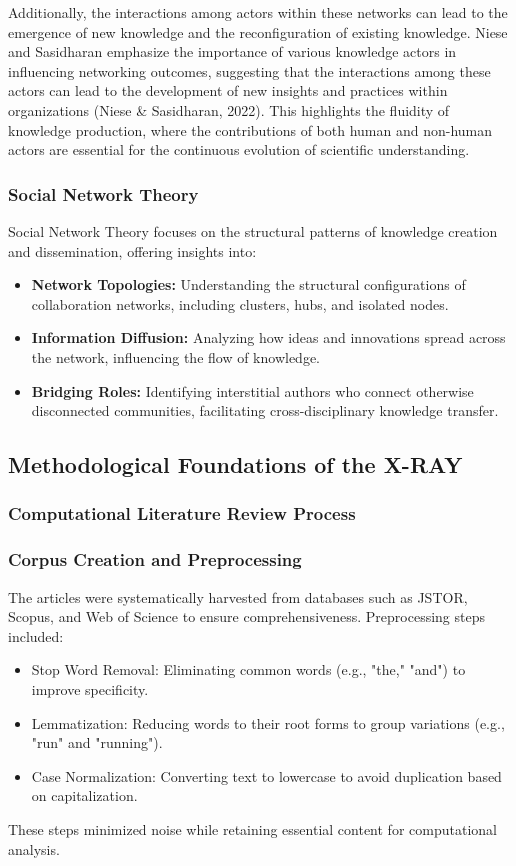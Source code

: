 \documentclass[12pt]{article}
\begin{document}
Additionally, the interactions among actors within these networks can lead to the emergence of new knowledge and the reconfiguration of existing knowledge. Niese and Sasidharan emphasize the importance of various knowledge actors in influencing networking outcomes, suggesting that the interactions among these actors can lead to the development of new insights and practices within organizations (Niese \& Sasidharan, 2022). This highlights the fluidity of knowledge production, where the contributions of both human and non-human actors are essential for the continuous evolution of scientific understanding.



\subsubsection{Social Network Theory}
Social Network Theory focuses on the structural patterns of knowledge creation and dissemination, offering insights into:
\begin{itemize}
    \item \textbf{Network Topologies:} Understanding the structural configurations of collaboration networks, including clusters, hubs, and isolated nodes.
    \item \textbf{Information Diffusion:} Analyzing how ideas and innovations spread across the network, influencing the flow of knowledge.
    \item \textbf{Bridging Roles:} Identifying interstitial authors who connect otherwise disconnected communities, facilitating cross-disciplinary knowledge transfer.
\end{itemize}

\subsection{Methodological Foundations of the X-RAY}

\subsubsection{Computational Literature Review Process}
\label{sec:clr_process}

\subsubsection{Corpus Creation and Preprocessing}
The articles were systematically harvested from databases such as JSTOR, Scopus, and Web of Science to ensure comprehensiveness. Preprocessing steps included:
\begin{itemize}
    \item Stop Word Removal: Eliminating common words (e.g., "the," "and") to improve specificity.
    \item Lemmatization: Reducing words to their root forms to group variations (e.g., "run" and "running").
    \item Case Normalization: Converting text to lowercase to avoid duplication based on capitalization.
\end{itemize}
These steps minimized noise while retaining essential content for computational analysis.
\end{document}
